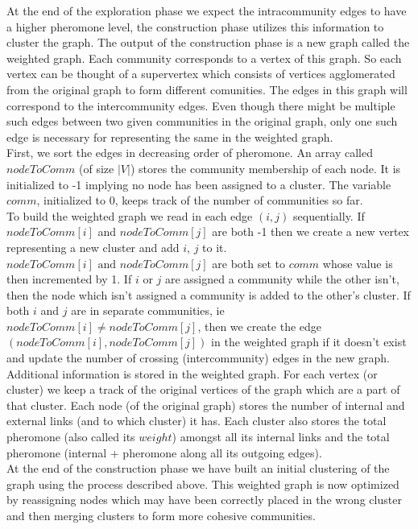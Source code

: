 \begin{spacing}{1.5}
At the end of the exploration phase we expect the intracommunity edges to have a higher pheromone level, the construction phase utilizes this information to cluster the graph. The output of the construction phase is a new graph called the weighted graph. Each community corresponds to a vertex of this graph. So each vertex can be thought of a supervertex which consists of vertices agglomerated from the original graph to form different comunities. The edges in this graph will correspond to the intercommunity edges. Even though there might be multiple such edges between two given communities in the original graph, only one such edge is necessary for representing the same in the weighted graph. \\
\indent First, we sort the edges in decreasing order of pheromone. An array called $nodeToComm$ (of size $|V|$) stores the community membership of each node. It is initialized to -1 implying no node has been assigned to a cluster. The variable $comm$, initialized to 0, keeps track of the number of communities so far. \\
\indent To build the weighted graph we read in each edge $(i, j)$ sequentially. If $nodeToComm[i]$ and $nodeToComm[j]$ are both -1 then we create a new vertex representing a new cluster and add $i$, $j$ to it. $nodeToComm[i] \text{ and } nodeToComm[j]$ are both set to $comm$ whose value is then incremented by 1. If $i$ or $j$ are assigned a community while the other isn't, then the node which isn't assigned a community is added to the other's cluster. If both $i$ and $j$ are in separate communities, ie $nodeToComm[i] \neq nodeToComm[j]$, then we create the edge $(nodeToComm[i], nodeToComm[j])$ in the weighted graph if it doesn't exist and update the number of crossing (intercommunity) edges in the new graph.\\
\indent Additional information is stored in the weighted graph. For each vertex (or cluster) we keep a track of the original vertices of the graph which are a part of that cluster. Each node (of the original graph) stores the number of internal and external links (and to which cluster) it has. Each cluster also stores the total pheromone (also called its $weight$) amongst all its internal links and the total pheromone (internal + pheromone along all its outgoing edges).\\
\indent At the end of the construction phase we have built an initial clustering of the graph using the process described above. This weighted graph is now optimized by reassigning nodes which may have been correctly placed in the wrong cluster and then merging clusters to form more cohesive communities.\\


\end{spacing}
